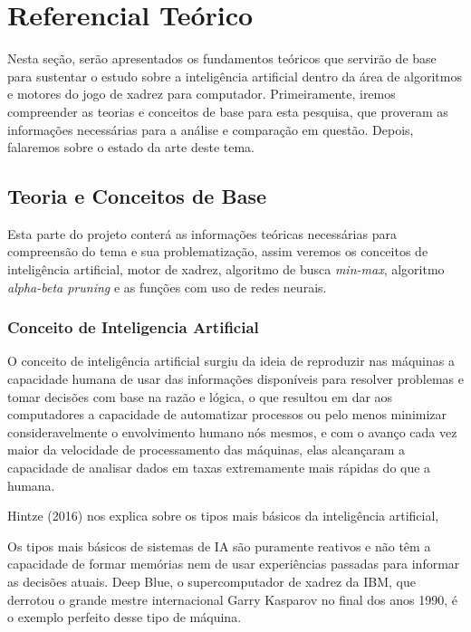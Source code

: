 \chapter{Referencial Teórico}
Nesta seção, serão apresentados os fundamentos teóricos que servirão de base para sustentar o estudo sobre a inteligência
artificial dentro da área de algoritmos e motores do jogo de xadrez para computador. Primeiramente, iremos compreender as
teorias e conceitos de base para esta pesquisa, que proveram as informações necessárias para a análise e comparação em questão.
Depois, falaremos sobre o estado da arte deste tema.

\section{Teoria e Conceitos de Base}
Esta parte do projeto conterá as informações teóricas necessárias para compreensão do tema e sua problematização,
assim veremos os conceitos de inteligência artificial, motor de xadrez, algoritmo de busca \textit{min-max},
algoritmo \textit{alpha-beta pruning} e as funções com uso de redes neurais.

\subsection{Conceito de Inteligencia Artificial}
O conceito de inteligência artificial surgiu da ideia de reproduzir nas máquinas a capacidade humana de usar das informações
disponíveis para resolver problemas e tomar decisões com base na razão e lógica, o que resultou em dar aos computadores a
capacidade de automatizar processos ou pelo menos minimizar consideravelmente o envolvimento humano nós mesmos,
e com o avanço cada vez maior da velocidade de processamento das máquinas, elas alcançaram a capacidade de analisar dados
em taxas extremamente mais rápidas do que a humana.

Hintze (2016) nos explica sobre os tipos mais básicos da inteligência artificial,
\begin{citacao}
    Os tipos mais básicos de sistemas de IA são puramente reativos e não têm a capacidade de formar memórias nem de usar
    experiências passadas para informar as decisões atuais. Deep Blue, o supercomputador de xadrez da IBM, que derrotou o
    grande mestre internacional Garry Kasparov no final dos anos 1990, é o exemplo perfeito desse tipo de máquina.
    \cite[tradução nossa.]{HINTZE}
\end{citacao}

